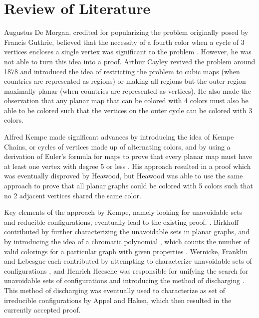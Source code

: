\documentclass{report}
\theoremstyle{plain}
\theoremstyle{definition}
\begin{document}
\vspace{.75in}
\section*{Review of Literature}

Augustus De Morgan, credited for popularizing the problem originally posed by Francis Guthrie, believed that the necessity of a fourth color when a cycle of 3 vertices encloses a single vertex was significant to the problem \cite[p. 24]{4cs}. However, he was not able to turn this idea into a proof. Arthur Cayley revived the problem around 1878 \cite[p. 62]{4cs} and introduced the idea of restricting the problem to cubic maps (when countries are represented as regions) or making all regions but the outer region maximally planar (when countries are represented as vertices). He also made the observation that any planar map that can be colored with 4 colors must also be able to be colored such that the vertices on the outer cycle can be colored with 3 colors.

Alfred Kempe made significant advances by introducing the idea of Kempe Chains, or cycles of vertices made up of alternating colors, and by using a derivation of Euler's formula for maps to prove that every planar map must have at least one vertex with degree 5 or less \cite[p. 79]{4cs}. His approach resulted in a proof which was eventually disproved by Heawood, but Heawood was able to use the same approach to prove that all planar graphs could be colored with 5 colors such that no 2 adjacent vertices shared the same color. \cite[p. 125]{4cs}

Key elements of the approach by Kempe, namely looking for unavoidable sets and reducible configurations, eventually lead to the existing proof. \cite[p. 146]{4cs}. Birkhoff contributed by further characterizing the unavoidable sets in planar graphs, and by introducing the idea of a chromatic polynomial \cite[p. 166]{4cs}, which counts the number of valid colorings for a particular graph with given properties \cite{chromatic-polynomial}. Wernicke, Franklin and Lebesgue each contributed by attempting to characterize unavoidable sets of configurations \cite[p. 169]{4cs}, and Henrich Heesche was responsible for unifying the search for unavoidable sets of configurations and introducing the method of discharging \cite[p. 172]{4cs}. This method of discharging was eventually used to characterize as set of irreducible configurations by Appel and Haken, which then resulted in the currently accepted proof.
\end{document}
